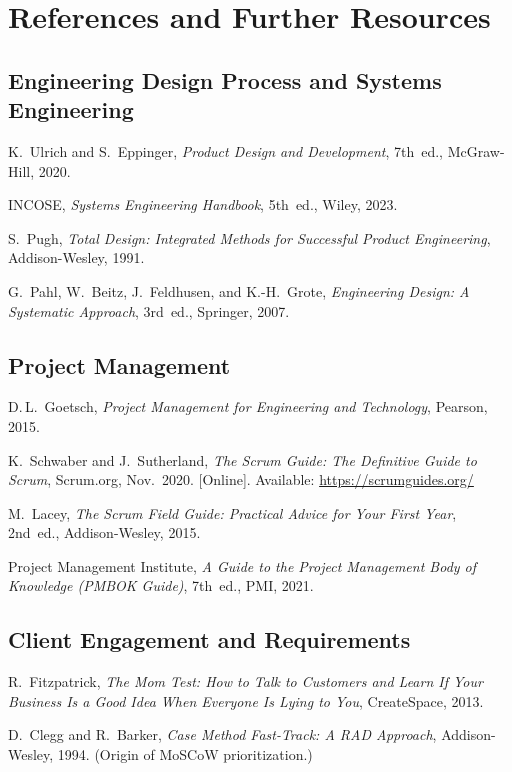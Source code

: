 \chapter*{References and Further Resources}

\section*{Engineering Design Process and Systems Engineering}
\begin{enumerate}[label={[\arabic*]},leftmargin=2em]
\item K.~Ulrich and S.~Eppinger, \emph{Product Design and Development}, 7th~ed., McGraw-Hill, 2020.
\item INCOSE, \emph{Systems Engineering Handbook}, 5th~ed., Wiley, 2023.
\item S.~Pugh, \emph{Total Design: Integrated Methods for Successful Product Engineering}, Addison-Wesley, 1991.
\item G.~Pahl, W.~Beitz, J.~Feldhusen, and K.-H.~Grote, \emph{Engineering Design: A Systematic Approach}, 3rd~ed., Springer, 2007.
\end{enumerate}

\section*{Project Management}
\begin{enumerate}[label={[\arabic*]},leftmargin=2em,resume]
\item D.\,L.~Goetsch, \emph{Project Management for Engineering and Technology}, Pearson, 2015.
\item K.~Schwaber and J.~Sutherland, \emph{The Scrum Guide: The Definitive Guide to Scrum}, Scrum.org, Nov.\ 2020. [Online]. Available: \url{https://scrumguides.org/}
\item M.~Lacey, \emph{The Scrum Field Guide: Practical Advice for Your First Year}, 2nd~ed., Addison-Wesley, 2015.
\item Project Management Institute, \emph{A Guide to the Project Management Body of Knowledge (PMBOK Guide)}, 7th~ed., PMI, 2021.
\end{enumerate}

\section*{Client Engagement and Requirements}
\begin{enumerate}[label={[\arabic*]},leftmargin=2em,resume]
\item R.~Fitzpatrick, \emph{The Mom Test: How to Talk to Customers and Learn If Your Business Is a Good Idea When Everyone Is Lying to You}, CreateSpace, 2013.
\item D.~Clegg and R.~Barker, \emph{Case Method Fast-Track: A RAD Approach}, Addison-Wesley, 1994. (Origin of MoSCoW prioritization.)
\end{enumerate}

